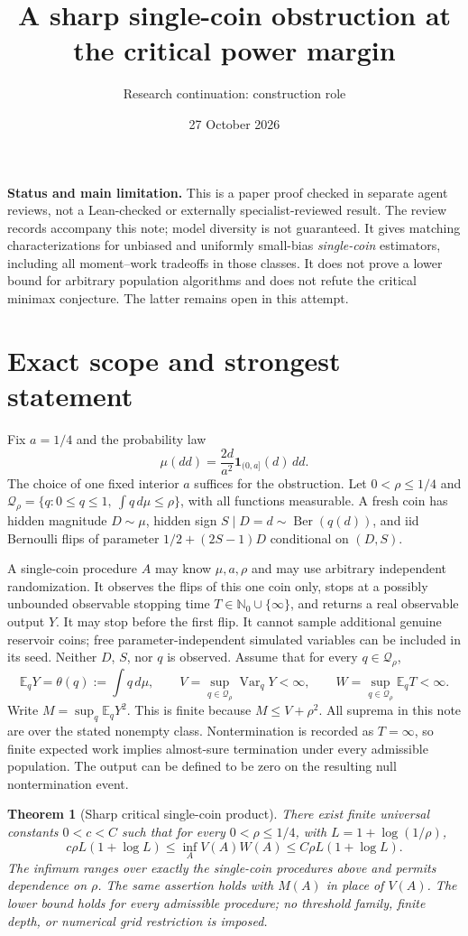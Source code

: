 \documentclass[11pt]{article}
\title{A sharp single-coin obstruction at the critical power margin}
\author{Research continuation: construction role}
\date{27 October 2026}
\newtheorem{theorem}{Theorem}
\newcommand{\E}{\mathbb E}
\newcommand{\Var}{\operatorname{Var}}
\newcommand{\ind}{\mathbf1}
\begin{document}
\maketitle

\noindent\textbf{Status and main limitation.} This is a paper proof checked in
separate agent reviews, not a Lean-checked or externally specialist-reviewed
result. The review records accompany this note; model diversity is not
guaranteed. It gives matching characterizations for unbiased and uniformly
small-bias \emph{single-coin} estimators, including all moment--work tradeoffs
in those classes. It does not prove a lower
bound for arbitrary population algorithms and does not refute the critical
minimax conjecture. The latter remains open in this attempt.

\section{Exact scope and strongest statement}
Fix $a=1/4$ and the probability law
\[
 \mu(dd)=\frac{2d}{a^2}\ind_{(0,a]}(d)\,dd.
\]
The choice of one fixed interior $a$ suffices for the obstruction. Let
$0<\rho\le1/4$ and
$\mathcal Q_\rho=\{q:0\le q\le1,\ \int q\,d\mu\le\rho\}$,
with all functions measurable. A fresh coin has hidden magnitude $D\sim\mu$,
hidden sign $S\mid D=d\sim\operatorname{Ber}(q(d))$, and iid Bernoulli flips
of parameter $1/2+(2S-1)D$ conditional on $(D,S)$.

A single-coin procedure $A$ may know $\mu,a,\rho$ and may use arbitrary
independent randomization. It observes the flips of this one coin only,
stops at a possibly unbounded observable stopping time
$T\in\mathbb N_0\cup\{\infty\}$, and returns a real
observable output $Y$. It may stop before the first flip. It cannot sample
additional genuine reservoir coins; free parameter-independent simulated
variables can be included in its seed. Neither $D$, $S$, nor $q$ is observed.
Assume that for every $q\in\mathcal Q_\rho$,
\[
 \E_qY=\theta(q):=\int q\,d\mu,
 \qquad
 V=\sup_{q\in\mathcal Q_\rho}\Var_qY<\infty,
 \qquad
 W=\sup_{q\in\mathcal Q_\rho}\E_qT<\infty.
\]
Write $M=\sup_q\E_qY^2$. This is finite because $M\le V+\rho^2$.
All suprema in this note are over the stated nonempty class.
Nontermination is recorded as $T=\infty$, so finite expected work implies
almost-sure termination under every admissible population. The output can be
defined to be zero on the resulting null nontermination event.

\begin{theorem}[Sharp critical single-coin product]\label{thm:main}
There exist finite universal constants $0<c<C$ such that for every
$0<\rho\le1/4$, with $L=1+\log(1/\rho)$,
\[
 c\rho L(1+\log L)
 \le \inf_A V(A)W(A)
 \le C\rho L(1+\log L).                                  \tag{1}
\]
The infimum ranges over exactly the single-coin procedures above and permits
dependence on $\rho$. The same assertion holds with $M(A)$ in place of $V(A)$.
The lower bound holds for every admissible procedure; no threshold family,
finite depth, or numerical grid restriction is imposed.
\end{theorem}
\end{document}
